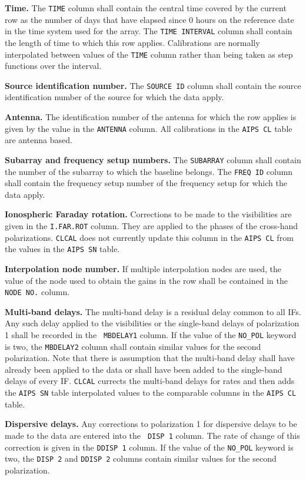 \documentclass[twoside]{article}
\newcommand{\Hi}[1]{\textcolor{hicol}{#1}}
\begin{document}
{\bf Time.}  The {\tt TIME} column shall contain the central time
covered by the current row as the number of days that have elapsed
since 0 hours on the reference date in the time system used for the
array.  The {\tt TIME INTERVAL} column shall contain the length of
time to which this row applies.  Calibrations are normally
interpolated between values of the {\tt TIME} column rather than being
taken as step functions over the interval.

{\bf Source identification number.}  The {\tt SOURCE ID} column shall
contain the source identification number of the source for which the
data apply.

{\bf Antenna.} The identification number of the antenna for which the
row applies is given by the value in the {\tt ANTENNA} column.  All
calibrations in the {\tt AIPS CL} table are antenna based.

{\bf Subarray  and frequency setup numbers.} The {\tt SUBARRAY} column
shall contain the number of the subarray to which the baseline belongs.
The {\tt FREQ ID} column shall contain the frequency setup number of
the frequency setup for which the data apply.

{\bf Ionospheric Faraday rotation.} Corrections to be made to the
visibilities are given in the {\tt I.FAR.ROT} column.  They are
applied to the phases of the cross-hand polarizations.  {\tt CLCAL}
does not currently update this column in the {\tt AIPS CL} from the
values in the {\tt AIPS SN} table.

{\bf Interpolation node number.}  If multiple interpolation nodes are
used, the value of the node used to obtain the gains in the row shall
be contained in the {\tt NODE NO.} column.

{\bf Multi-band delays.} The multi-band delay is a residual delay
common to all IFs.  Any such delay applied to the visibilities or the
single-band delays of polarization 1 shall be recorded in the {\tt
MBDELAY1} column.  If the value of the {\tt NO\_POL} keyword is two,
the {\tt MBDELAY2} column shall contain similar values for the second
polarization.  Note that there is assumption that the multi-band delay
shall have already been applied to the data or shall have been added
to the single-band delays of every IF\@.  {\tt CLCAL} currects the
multi-band delays for rates and then adds the {\tt AIPS SN} table
interpolated values to the comparable columns in the {\tt AIPS CL}
table.

\Hi{{\bf Dispersive delays.}  Any corrections to polarization 1 for
dispersive delays to be made to the data are entered into the {\tt
  DISP 1} column.  The rate of change of this correction is given in
the {\tt DDISP 1} column.  If the value of the {\tt NO\_POL} keyword
is two, the {\tt DISP 2} and {\tt DDISP 2} columns contain similar
values for the second polarization.}
\end{document}
